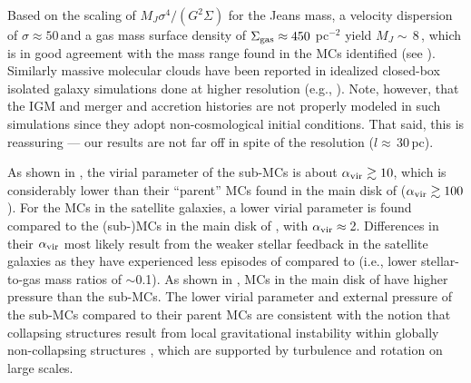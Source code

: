 \IfFileExists{emulateapjlegacy.cls}{\documentclass[iop]{emulateapjlegacy}}{\documentclass[iop]{emulateapj}}
\newcommand{\DL}[1]{({\bf \color{dlcolor} DL: #1})}
\begin{document}
Based on the scaling of $M_J$\eq$\sigma^4/(G^2\Sigma)$ for the Jeans mass,
a velocity dispersion of $\sigma\approx50$\,\kms and a gas mass surface density of
$\Sigma_{\rm gas}\approx450$\,\Msun\,pc$^{-2}$
yield $M_J\sim$\,8\,\Msun, which is in good agreement with the mass range found in the MCs identified (see ).
Similarly massive molecular clouds have been reported in idealized closed-box isolated galaxy
simulations done at higher resolution (e.g., \citealt{Behrendt16a}).
Note, however, that the IGM and merger and accretion histories are not properly modeled in such simulations
since they adopt non-cosmological initial conditions.
That said, this is reassuring --- our results are not far off in spite of the resolution ($l\approx$\,30\,pc).


As shown in , the virial parameter of the sub-MCs is about $\alpha_{\rm vir}\gtrsim10$, which 
is considerably lower than their ``parent'' MCs found in the main disk of \flower ($\alpha_{\rm vir}\gtrsim100$).
For the MCs in the satellite galaxies, a lower virial parameter is found 
compared to the (sub-)MCs in the main disk of \flower, with $\alpha_{\rm vir}\approx$\,2.
Differences in their $\alpha_{\rm vir}$ most likely result from the weaker
stellar feedback in the satellite galaxies as they have experienced less episodes of \SF compared to
\flower (i.e., lower stellar-to-gas mass ratios of $\sim$0.1).
As shown in , MCs in the main disk of \flower have higher pressure than the sub-MCs.
The lower virial parameter and external pressure of the sub-MCs
compared to their parent MCs are consistent with
the notion that collapsing structures result from local gravitational
instability within globally non-collapsing structures \citep[see e.g.,][]{Ballesteros-Paredes11a},
which are supported by turbulence and rotation on large scales.
\end{document}
